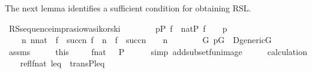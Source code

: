 \begin{isabellebody}
\begin{isamarkuptext}%
The next lemma identifies a sufficient condition for obtaining
RSL.%
\end{isamarkuptext}\isamarkuptrue%
\isamarkupfalse%
\ RS{\isacharunderscore}{\kern0pt}sequence{\isacharunderscore}{\kern0pt}imp{\isacharunderscore}{\kern0pt}rasiowa{\isacharunderscore}{\kern0pt}sikorski{\isacharcolon}{\kern0pt}\isanewline
\ \ \ \isanewline
\ \ \ \ {\isachardoublequoteopen}p{\isasymin}P{\isachardoublequoteclose}\ {\isachardoublequoteopen}f\ {\isacharcolon}{\kern0pt}\ nat{\isasymrightarrow}P{\isachardoublequoteclose}\ {\isachardoublequoteopen}f\ {\isacharbackquote}{\kern0pt}\ {}\ {\isacharequal}{\kern0pt}\ p{\isachardoublequoteclose}\isanewline
\ \ \ \ {\isachardoublequoteopen}{\isasymAnd}n{\isachardot}{\kern0pt}\ n{\isasymin}nat\ {\isasymLongrightarrow}\ f\ {\isacharbackquote}{\kern0pt}\ succ{\isacharparenleft}{\kern0pt}n{\isacharparenright}{\kern0pt}{\isasympreceq}\ f\ {\isacharbackquote}{\kern0pt}\ n\ {\isasymand}\ f\ {\isacharbackquote}{\kern0pt}\ succ{\isacharparenleft}{\kern0pt}n{\isacharparenright}{\kern0pt}\ {\isasymin}\ {\isasymD}\ {\isacharbackquote}{\kern0pt}\ n{\isachardoublequoteclose}\ \isanewline
\ \ \isanewline
\ \ \ \ {\isachardoublequoteopen}{\isasymexists}G{\isachardot}{\kern0pt}\ p{\isasymin}G\ {\isasymand}\ D{\isacharunderscore}{\kern0pt}generic{\isacharparenleft}{\kern0pt}G{\isacharparenright}{\kern0pt}{\isachardoublequoteclose}\isanewline
%
\isadelimproof
%
\endisadelimproof
%
\isatagproof
{}\isamarkupfalse%
\ {\isacharminus}{\kern0pt}\isanewline
\ \ \isamarkupfalse%
\ assms\isanewline
\ \ \isamarkupfalse%
\ \isamarkupfalse%
\ this\ \isanewline
\ \ \isamarkupfalse%
\ {\isachardoublequoteopen}f{\isacharbackquote}{\kern0pt}{\isacharbackquote}{\kern0pt}nat\ \ {\isasymsubseteq}\ P{\isachardoublequoteclose}\isanewline
\ \ \ \ \isamarkupfalse%
\ {\isacharparenleft}{\kern0pt}simp\ add{\isacharcolon}{\kern0pt}subset{\isacharunderscore}{\kern0pt}fun{\isacharunderscore}{\kern0pt}image{\isacharparenright}{\kern0pt}\isanewline
\ \ \isamarkupfalse%
\ \isamarkupfalse%
\ calculation\isanewline
\ \ \isamarkupfalse%
\ {\isachardoublequoteopen}refl{\isacharparenleft}{\kern0pt}f{\isacharbackquote}{\kern0pt}{\isacharbackquote}{\kern0pt}nat{\isacharcomma}{\kern0pt}\ leq{\isacharparenright}{\kern0pt}\ {\isasymand}\ trans{\isacharbrackleft}{\kern0pt}P{\isacharbrackright}{\kern0pt}{\isacharparenleft}{\kern0pt}leq{\isacharparenright}{\kern0pt}{\isachardoublequoteclose}\isanewline

\end{isabellebody}
